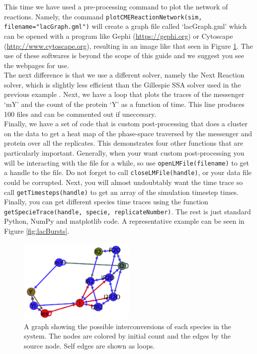 This time we have used a pre-processing command to plot the network of reactions.  Namely, the command \texttt{plotCMEReactionNetwork(sim, filename="lacGraph.gml")} will create a graph file called `lacGraph.gml' which can be opened with a program like Gephi (\url{https://gephi.org})  or Cytoscape (\url{http://www.cytoscape.org}), resulting in an image like that seen in Figure \ref{fig:lacGraph}.  The use of these softwares is beyond the scope of this guide and we suggest you see the webpages for use. \\

The next difference is that we use a different solver, namely the Next Reaction solver, which is slightly less efficient than the Gillespie SSA solver used in the previous example \cite{Roberts2013lmh}.  Next, we have a loop that plots the traces of the messenger `mY' and the count of the protein `Y' as a function of time.  This line produces 100 files and can be commented out if uneccesary.  \\

Finally, we have a set of code that is custom post-processing that does a cluster on the data to get a heat map of the phase-space traversed by the messenger and protein over all the replicates. This demonstrates four other functions that are particularly important.  Generally, when your want custom post-processing you will be interacting with the file for a while, so use \texttt{openLMFile(filename)} to get a handle to the file.  Do not forget to call \texttt{closeLMFile(handle)}, or your data file could be corrupted.  Next, you will almost undoubtably want the time trace so call \texttt{getTimesteps(handle)} to get an array of the simulation timestep times.  Finally, you can get different species time traces using the function \texttt{getSpecieTrace(handle, specie, replicateNumber)}.  The rest is just standard Python, NumPy and matplotlib code.  A representative example can be seen in Figure \ref{fig:lacBursts}. \\

\begin{figure}[h!]
  \centering
        \includegraphics[width=0.5\textwidth]{Figures/LacGraph.pdf}
        \caption{A graph showing the possible interconversions of each species in the system.  The nodes are colored by initial count and the edges by the source node.  Self edges are shown as loops.} \label{fig:lacGraph}
\end{figure}

